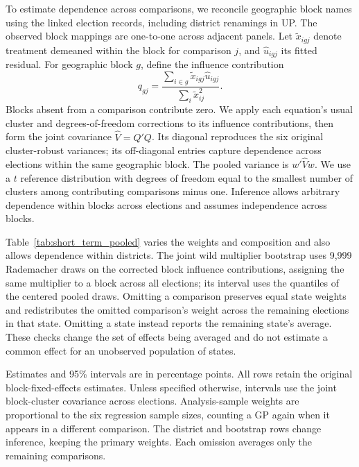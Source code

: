 To estimate dependence across comparisons, we reconcile geographic block names using the linked election records, including district renamings in UP. The observed block mappings are one-to-one across adjacent panels. Let $\widetilde x_{igj}$ denote treatment demeaned within the block for comparison $j$, and $\widehat u_{igj}$ its fitted residual. For geographic block $g$, define the influence contribution
\[
 q_{gj}=\frac{\sum_{i\in g}\widetilde x_{igj}\widehat u_{igj}}{\sum_i\widetilde x_{ij}^{2}}.
\]
Blocks absent from a comparison contribute zero. We apply each equation's usual cluster and degrees-of-freedom corrections to its influence contributions, then form the joint covariance $\widehat V=Q'Q$. Its diagonal reproduces the six original cluster-robust variances; its off-diagonal entries capture dependence across elections within the same geographic block. The pooled variance is $w'\widehat Vw$. We use a $t$ reference distribution with degrees of freedom equal to the smallest number of clusters among contributing comparisons minus one. Inference allows arbitrary dependence within blocks across elections and assumes independence across blocks.

Table~\ref{tab:short_term_pooled} varies the weights and composition and also allows dependence within districts. The joint wild multiplier bootstrap uses 9,999 Rademacher draws on the corrected block influence contributions, assigning the same multiplier to a block across all elections; its interval uses the quantiles of the centered pooled draws. Omitting a comparison preserves equal state weights and redistributes the omitted comparison's weight across the remaining elections in that state. Omitting a state instead reports the remaining state's average. These checks change the set of effects being averaged and do not estimate a common effect for an unobserved population of states.

\begin{table}[!htbp]
    \centering
    \caption{Sensitivity of the Average Next-Election Effect}
    \label{tab:short_term_pooled}
    \small
    
    \par\smallskip
    \begin{minipage}{\textwidth}\footnotesize
    Estimates and 95\% intervals are in percentage points. All rows retain the original block-fixed-effects estimates. Unless specified otherwise, intervals use the joint block-cluster covariance across elections. Analysis-sample weights are proportional to the six regression sample sizes, counting a GP again when it appears in a different comparison. The district and bootstrap rows change inference, keeping the primary weights. Each omission averages only the remaining comparisons.
    \end{minipage}
\end{table}
\FloatBarrier

